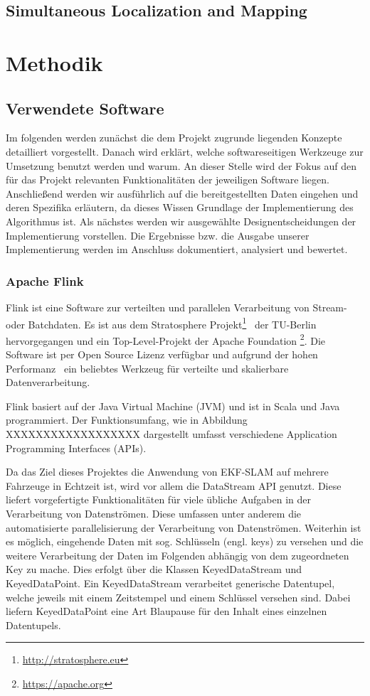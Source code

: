 \documentclass[11pt]{article}
\begin{document}
\subsection{Simultaneous Localization and Mapping}

\section{Methodik}\label{Methodik}
\subsection{Verwendete Software}
Im folgenden werden zunächst die dem Projekt zugrunde liegenden Konzepte detailliert vorgestellt. Danach wird erklärt, welche softwareseitigen Werk\-zeu\-ge zur Umsetzung benutzt werden und warum. An dieser Stelle wird der Fokus auf den für das Projekt relevanten Funktionalitäten der jeweiligen Software liegen. Anschließend werden wir ausführlich auf die bereitgestellten Daten eingehen und deren Spezifika erläutern, da dieses Wissen Grundlage der Implementierung des Algorithmus ist. Als nächstes werden wir ausgewählte Designentscheidungen der Implementierung vorstellen. Die Ergebnisse bzw. die Ausgabe unserer Implementierung werden im Anschluss dokumentiert, analysiert und bewertet.

\subsubsection{Apache Flink}
Flink ist eine Software zur verteilten und parallelen Verarbeitung von Stream- oder Batch\-daten. Es ist aus dem Stratosphere Projekt\footnote{\url{http://stratosphere.eu}}~\cite{alexandrov_stratosphere_2014} der TU-Berlin hervorgegangen und ein Top-Level-Projekt der Apache Foundation \footnote{\url{https://apache.org}}. Die Software ist per Open Source Lizenz verfügbar und aufgrund der hohen Performanz~\cite{alexandrov_stratosphere_2014} ein beliebtes Werkzeug für verteilte und skalierbare Datenverarbeitung.

Flink basiert auf der Java Virtual Machine (JVM) und ist in Scala und Java programmiert. Der Funktionsumfang, wie in Abbildung XXXXXXXXXXXXXXXXXX dargestellt umfasst verschiedene Application Programming Interfaces (APIs). 

Da das Ziel dieses Projektes die Anwendung von EKF-SLAM auf mehrere Fahrzeuge in Echtzeit ist, wird vor allem die DataStream API genutzt. Diese liefert vorgefertigte Funktionalitäten für viele übliche Aufgaben in der Verarbeitung von Datenströmen. Diese umfassen unter anderem die automatisierte parallelisierung der Verarbeitung von Datenströmen. Weiterhin ist es möglich, eingehende Daten mit sog. Schlüsseln (engl. keys) zu versehen und die weitere Verarbeitung der Daten im Folgenden abhängig von dem zugeordneten Key zu mache. Dies erfolgt über die Klassen KeyedDataStream und KeyedDataPoint. Ein KeyedDataStream verarbeitet generische Datentupel, welche jeweils mit einem Zeitstempel und einem Schlüssel versehen sind. Dabei liefern KeyedDataPoint eine Art Blaupause für den Inhalt eines einzelnen Datentupels.
\end{document}

